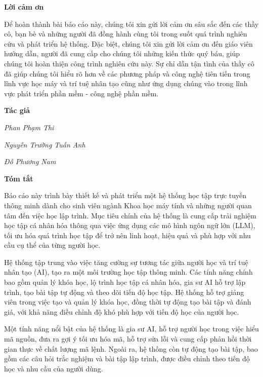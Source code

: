 \documentclass[12pt,a4paper]{report}
\theoremstyle{definition}
\begin{document}
\begin{center}
    \textbf{\Large Lời cảm ơn}
\end{center}

\par Để hoàn thành bài báo cáo này, chúng tôi xin gửi lời cảm ơn sâu sắc đến các thầy cô, bạn bè và những người đã đồng hành cùng tôi trong suốt quá trình nghiên cứu và phát triển hệ thống. Đặc biệt, chúng tôi xin gửi lời cảm ơn đến giáo viên hướng dẫn, người đã cung cấp cho chúng tôi những kiến thức quý báu, giúp chúng tôi hoàn thiện công trình nghiên cứu này. Sự chỉ dẫn tận tình của thầy cô đã giúp chúng tôi hiểu rõ hơn về các phương pháp và công nghệ tiên tiến trong lĩnh vực học máy và trí tuệ nhân tạo cũng như ứng dụng chúng vào trong lĩnh vực phát triển phần mềm - công nghệ phần mềm.

\par\hfill\textbf{Tác giả}\hspace{1cm}
\par\hfill\textit{Phan Phạm Thi}
\par\hfill\textit{Nguyễn Trường Tuấn Anh}\hspace{0.3cm}
\par\hfill\textit{Đỗ Phương Nam}\hspace{0.2cm}
\newpage

\begin{center}
    \textbf{\Large Tóm tắt}
\end{center}

\par Báo cáo này trình bày thiết kế và phát triển một hệ thống học tập trực tuyến thông minh dành cho sinh viên ngành Khoa học máy tính và những người quan tâm đến việc học lập trình. Mục tiêu chính của hệ thống là cung cấp trải nghiệm học tập cá nhân hóa thông qua việc ứng dụng các mô hình ngôn ngữ lớn (LLM), tối ưu hóa quá trình học tập để trở nên linh hoạt, hiệu quả và phù hợp với nhu cầu cụ thể của từng người học.

\par Hệ thống tập trung vào việc tăng cường sự tương tác giữa người học và trí tuệ nhân tạo (AI), tạo ra một môi trường học tập thông minh. Các tính năng chính bao gồm quản lý khóa học, lộ trình học tập cá nhân hóa, gia sư AI hỗ trợ lập trình, tạo bài tập tự động và theo dõi tiến độ học tập. Hệ thống hỗ trợ giảng viên trong việc tạo và quản lý khóa học, đồng thời tự động tạo bài tập và đánh giá, với khả năng điều chỉnh độ khó phù hợp với tiến độ học của người học.

\par Một tính năng nổi bật của hệ thống là gia sư AI, hỗ trợ người học trong việc hiểu mã nguồn, đưa ra gợi ý tối ưu hóa mã, hỗ trợ sửa lỗi và cung cấp phản hồi thời gian thực về chất lượng mã lệnh. Ngoài ra, hệ thống còn tự động tạo bài tập, bao gồm các câu hỏi trắc nghiệm và bài tập lập trình, được điều chỉnh theo tiến độ học và nhu cầu của người dùng.
\end{document}
